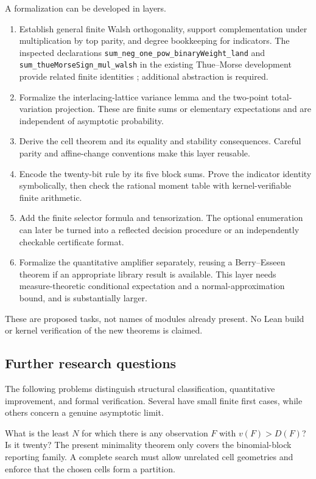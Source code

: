 A formalization can be developed in layers.
\begin{enumerate}
\item Establish general finite Walsh orthogonality, support
complementation under multiplication by top parity, and degree
bookkeeping for indicators. The inspected declarations
\texttt{sum\_neg\_one\_pow\_binaryWeight\_land} and
\texttt{sum\_thueMorseSign\_mul\_walsh} in the existing
Thue--Morse development provide related finite identities
\cite{ProveItWalsh}; additional abstraction is required.
\item Formalize the interlacing-lattice variance lemma and the
two-point total-variation projection. These are finite sums or
elementary expectations and are independent of asymptotic probability.
\item Derive the cell theorem and its equality and stability
consequences. Careful parity and affine-change conventions make this
layer reusable.
\item Encode the twenty-bit rule by its five block sums. Prove the
indicator identity symbolically, then check the rational moment table
with kernel-verifiable finite arithmetic.
\item Add the finite selector formula and tensorization. The optional
enumeration can later be turned into a reflected decision procedure
or an independently checkable certificate format.
\item Formalize the quantitative amplifier separately, reusing a
Berry--Esseen theorem if an appropriate library result is available.
This layer needs measure-theoretic conditional expectation and a
normal-approximation bound, and is substantially larger.
\end{enumerate}
These are proposed tasks, not names of modules already present.
No Lean build or kernel verification of the new theorems is claimed.

\subsection{Further research questions}

The following problems distinguish structural classification,
quantitative improvement, and formal verification. Several have small
finite first cases, while others concern a genuine asymptotic limit.

\begin{question}
What is the least \(N\) for which there is any observation \(F\) with
\(v(F)>D(F)\)? Is it twenty? The present minimality theorem only
covers the binomial-block reporting family. A complete search must
allow unrelated cell geometries and enforce that the chosen cells
form a partition.
\end{question}


